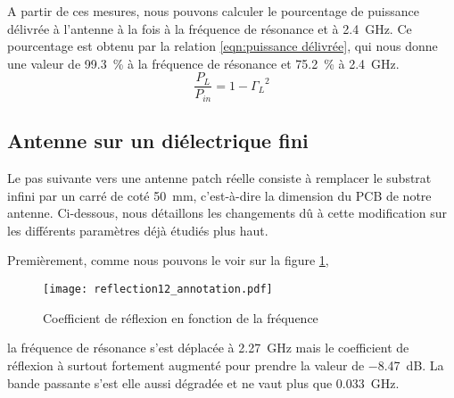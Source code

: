A partir de ces mesures, nous pouvons calculer le pourcentage de puissance délivrée à l'antenne à la fois à la fréquence de résonance et à \SI{2.4}{\giga\hertz}. Ce pourcentage est obtenu par la relation \ref{eqn:puissance délivrée}, qui nous donne une valeur de \SI{99.3}{\percent} à la fréquence de résonance et \SI{75.2}{\percent} à \SI{2.4}{\giga\hertz}.
\begin{equation}
\frac{P_L}{P_{in}} = 1-{\Gamma_L}^2
\label{eqn:puissance délivrée}
\end{equation}


\subsection{Antenne sur un diélectrique fini}
Le pas suivante vers une antenne patch réelle consiste à remplacer le substrat infini par un carré de coté \SI{50}{\milli\meter}, c'est-à-dire la dimension du PCB de notre antenne. Ci-dessous, nous détaillons les changements dû à cette modification sur les différents paramètres déjà étudiés plus haut.

Premièrement, comme nous pouvons le voir sur la figure \ref{fig:reflection12_annotation},
\begin{figure}[htbp]
\centering
\texttt{[image: reflection12\_annotation.pdf]}
\caption{Coefficient de réflexion en fonction de la fréquence\label{fig:reflection12_annotation}}
\end{figure}
la fréquence de résonance s'est déplacée à \SI{2.27}{\giga\hertz} mais le coefficient de réflexion à surtout fortement augmenté pour prendre la valeur de \SI{-8.47}{\deci\bel}. La bande passante s'est elle aussi dégradée et ne vaut plus que \SI{0.033}{\giga\hertz}.

